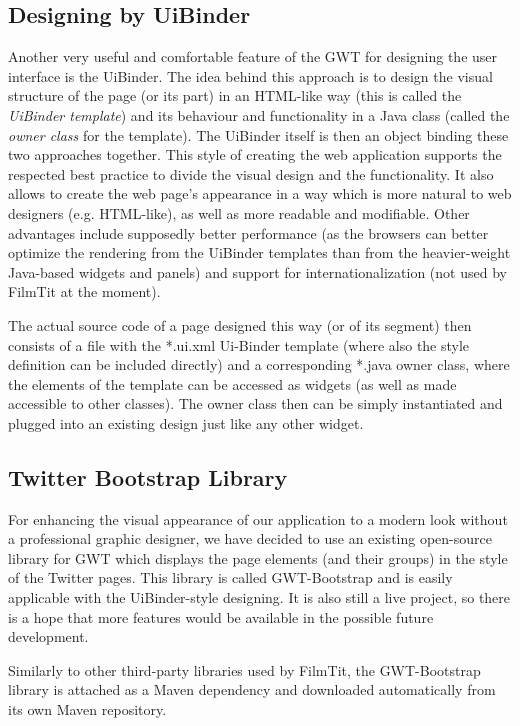 \subsection{Designing by UiBinder}
Another very useful and comfortable feature of the GWT for designing the user interface is the UiBinder. The idea behind this approach is to design the visual structure of the page (or its part) in an HTML-like way (this is called the {\em UiBinder template}) and its behaviour and functionality in a Java class (called the {\em owner class} for the template). The UiBinder itself is then an object binding these two approaches together. This style of creating the web application supports the respected best practice to divide the visual design and the functionality. It also allows to create the web page's appearance in a way which is more natural to web designers (e.g. HTML-like), as well as more readable and modifiable. Other advantages include supposedly better performance (as the browsers can better optimize the rendering from the UiBinder templates than from the heavier-weight Java-based widgets and panels) and support for internationalization (not used by FilmTit at the moment).

The actual source code of a page designed this way (or of its segment) then consists of a file with the *.ui.xml Ui-Binder template (where also the style definition can be included directly) and a corresponding *.java owner class, where the elements of the template can be accessed as widgets (as well as made accessible to other classes). The owner class then can be simply instantiated and plugged into an existing design just like any other widget.

\subsection{Twitter Bootstrap Library}
For enhancing the visual appearance of our application to a modern look without a professional graphic designer, we have decided to use an existing open-source library for GWT which displays the page elements (and their groups) in the style of the Twitter pages. This library is called GWT-Bootstrap and is easily applicable with the UiBinder-style designing. It is also still a live project, so there is a hope that more features would be available in the possible future development.

Similarly to other third-party libraries used by FilmTit, the GWT-Bootstrap library is attached as a Maven dependency and downloaded automatically from its own Maven repository.


